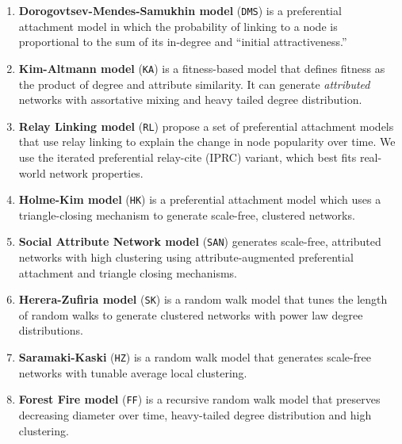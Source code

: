 \begin{enumerate}
	\item{\textbf{Dorogovtsev-Mendes-Samukhin model}} \cite{dorogovtsev2000structure}  (\texttt{DMS})
	is a preferential attachment model in which the probability of linking to a node is proportional
	to the sum of its in-degree and ``initial attractiveness.''

	\item{\textbf{Kim-Altmann model}} \cite{kim2017effect} (\texttt{KA}) is a fitness-based model that defines
	fitness as the product of degree and attribute similarity. It can generate \textit{attributed} networks
	with assortative mixing and heavy tailed degree distribution.

	\item{\textbf{Relay Linking model}} \cite{singh2017relay} (\texttt{RL}) propose a set of
	preferential attachment models that use relay linking to explain the change in node popularity over time.
	We use the iterated preferential relay-cite (IPRC) variant, which best fits real-world network properties.

	\item{\textbf{Holme-Kim model}} \cite{holme2002growing} (\texttt{HK}) is a preferential attachment model
	which uses a triangle-closing mechanism to generate scale-free, clustered networks.

	\item{\textbf{Social Attribute Network model}} \cite{gong2012evolution} (\texttt{SAN}) generates
	scale-free, attributed networks with high clustering using attribute-augmented
	preferential attachment and triangle closing mechanisms.

	\item{\textbf{Herera-Zufiria model}} \cite{saramaki2004scale} (\texttt{SK})  is a random walk model
	that tunes the length of random walks to generate clustered networks with power law degree distributions.

	\item{\textbf{Saramaki-Kaski}} \cite{herrera2011generating} (\texttt{HZ}) is a random walk model
	that generates scale-free networks with tunable average local clustering.

	\item{\textbf{Forest Fire model}} \cite{leskovec2005graphs} (\texttt{FF}) is a recursive random walk model
	that preserves decreasing diameter over time, heavy-tailed degree distribution
	and high clustering.
\end{enumerate}

